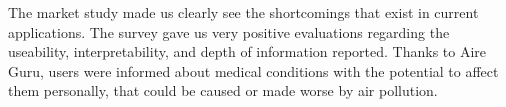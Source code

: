 \begin{itemize}
    \done The market study made us clearly see the shortcomings that exist in current applications.
    \done The survey gave us very positive evaluations regarding the useability, interpretability, and depth of information reported.
    \done Thanks to Aire Guru, users were informed about medical conditions with the potential to affect them personally, that could be caused or made worse by air pollution.

\end{itemize}
 

\newpage